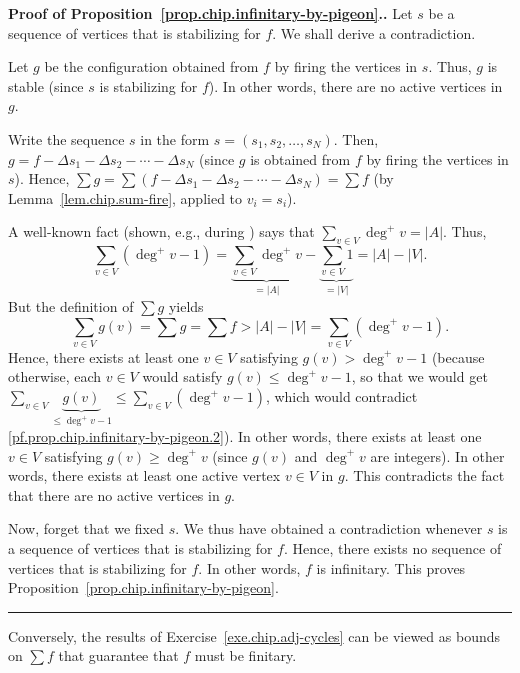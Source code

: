 \documentclass[numbers=enddot,12pt,final,onecolumn,notitlepage]{scrartcl}%
\theoremstyle{definition}
\newenvironment{proof}[1][Proof]{\noindent\textbf{#1.} }{\ \rule{0.5em}{0.5em}}
\let\sumnonlimits\sum
\renewcommand{\sum}{\sumnonlimits\limits}
\newcommand{\abs}[1]{\left| #1 \right|}
\newcommand{\tup}[1]{\left( #1 \right)}
\begin{document}
\begin{proof}[Proof of Proposition~\ref{prop.chip.infinitary-by-pigeon}.]
Let $s$ be a sequence of vertices that is stabilizing for $f$.
We shall derive a contradiction.

Let $g$ be the configuration obtained from $f$ by
firing the vertices in $s$.
Thus, $g$ is stable (since $s$ is stabilizing for $f$).
In other words, there are no active vertices in $g$.

Write the sequence $s$ in the form
$s = \tup{s_1, s_2, \ldots, s_N}$.
Then, $g = f - \Delta s_1 - \Delta s_2 - \cdots - \Delta s_N$
(since $g$ is obtained from $f$ by firing the vertices in $s$).
Hence,
$\sum g
= \sum \tup{f - \Delta s_1 - \Delta s_2 - \cdots - \Delta s_N}
= \sum f$
(by Lemma~\ref{lem.chip.sum-fire}, applied to $v_i = s_i$).

A well-known fact
(shown, e.g., during \cite[solution to Exercise 4]{hw2s})
says that
$\sum_{v \in V} \deg^+ v = \abs{A}$.
Thus,
\[
\sum_{v \in V} \tup{\deg^+ v - 1}
= \underbrace{\sum_{v \in V} \deg^+ v}_{= \abs{A}}
- \underbrace{\sum_{v \in V} 1}_{= \abs{V}}
= \abs{A} - \abs{V}.
\]
But the definition of $\sum g$ yields
\begin{equation}
\sum_{v \in V} g \tup{v} = \sum g = \sum f
> \abs{A} - \abs{V}
= \sum_{v \in V} \tup{\deg^+ v - 1} .
\label{pf.prop.chip.infinitary-by-pigeon.2}
\end{equation}
Hence, there exists at least one $v \in V$ satisfying
$g \tup{v} > \deg^+ v - 1$
(because otherwise, each $v \in V$ would satisfy
$g \tup{v} \leq \deg^+ v - 1$,
so that
we would get 
$\sum_{v \in V} \underbrace{g \tup{v}}_{\leq \deg^+ v - 1}
\leq \sum_{v \in V} \tup{\deg^+ v - 1}$,
which would contradict
\eqref{pf.prop.chip.infinitary-by-pigeon.2}).
In other words, there exists at least one $v \in V$ satisfying
$g \tup{v} \geq \deg^+ v$
(since $g \tup{v}$ and $\deg^+ v$ are integers).
In other words, there exists at least one active vertex
$v \in V$ in $g$.
This contradicts the fact that there are no active vertices in $g$.

Now, forget that we fixed $s$.
We thus have obtained a contradiction
whenever $s$ is a sequence of vertices that is stabilizing for $f$.
Hence, there exists no sequence of vertices that is stabilizing
for $f$.
In other words, $f$ is infinitary.
This proves Proposition~\ref{prop.chip.infinitary-by-pigeon}.
\end{proof}

Conversely, the results of
Exercise~\ref{exe.chip.adj-cycles} can be viewed as
bounds on $\sum f$ that guarantee that $f$ must be
finitary.
\end{document}
